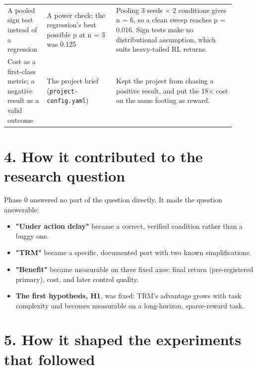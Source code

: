 \documentclass[11pt]{article}
\begin{document}
\begin{center}
\begin{tabular}{>{\raggedright\arraybackslash}p{0.138\linewidth}>{\raggedright\arraybackslash}p{0.282\linewidth}>{\raggedright\arraybackslash}p{0.486\linewidth}}
A pooled sign test instead of a regression & A power check: the regression's best possible p at n = 3 was 0.125 & Pooling 3 seeds $\times$ 2 conditions gives n = 6, so a clean sweep reaches p = 0.016. Sign tests make no distributional assumption, which suits heavy-tailed RL returns. \\
Cost as a first-class metric; a negative result as a valid outcome & The project brief (\texttt{project-config.\allowbreak{}yaml}) & Kept the project from chasing a positive result, and put the 18$\times$ cost on the same footing as reward. \\
\bottomrule
\end{tabular}\end{center}



\section*{4. How it contributed to the research question}



Phase 0 answered no part of the question directly. It made the question answerable:



\begin{itemize}
\item \textbf{"Under action delay"} became a correct, verified condition rather than a buggy one.
\item \textbf{"TRM"} became a specific, documented port with two known simplifications.
\item \textbf{"Benefit"} became measurable on three fixed axes: final return (pre-registered primary), cost, and later control quality.
\item \textbf{The first hypothesis, H1}, was fixed: TRM's advantage grows with task complexity and becomes measurable on a long-horizon, sparse-reward task.
\end{itemize}



\section*{5. How it shaped the experiments that followed}
\end{document}

